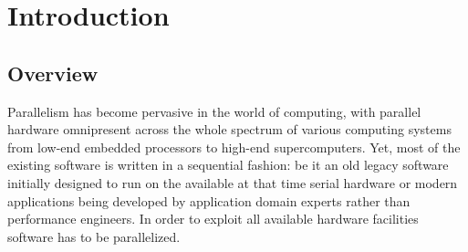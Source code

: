 \chapter{Introduction}
\label{introduction}

\section{Overview}
\label{introduction_overview}
\quad Parallelism has become pervasive in the world of computing, with parallel hardware omnipresent across the whole spectrum of various computing systems from low-end embedded processors to high-end supercomputers. Yet, most of the existing software is written in a sequential fashion: be it an old legacy software initially designed to run on the available at that time serial hardware or modern applications being developed by application domain experts rather than performance engineers. In order to exploit all available hardware facilities software has to be parallelized.
